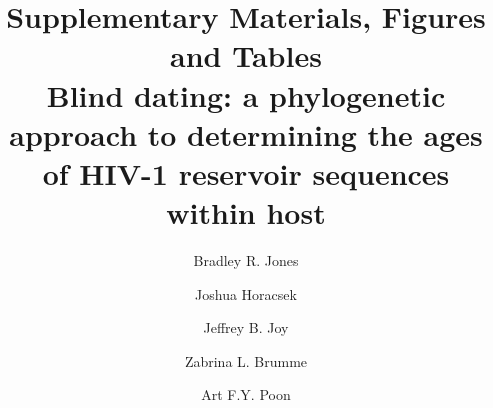 \documentclass[12pt]{article}
\begin{document}
\title{Supplementary Materials, Figures and Tables \\ Blind dating: a phylogenetic approach to determining the ages of HIV-1 reservoir sequences within host}

\author[1,2]{Bradley R. Jones}
\author[1,2]{Joshua Horacsek}
\author[2,3]{Jeffrey B. Joy}
\author[1,2]{Zabrina L. Brumme}
\author[1,2,3]{Art F.Y. Poon}
\baselineskip 22pt
\pagewiselinenumbers

\date{}
\maketitle

\end{document}
